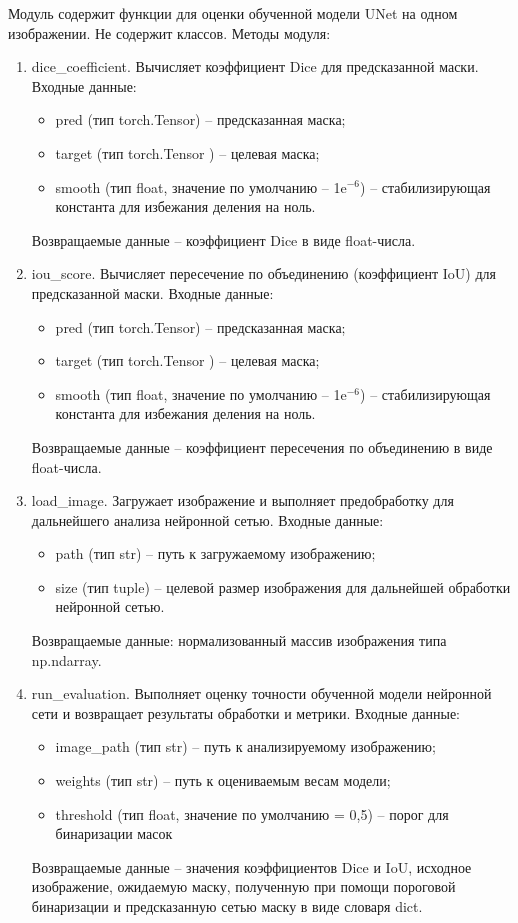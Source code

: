 Модуль содержит функции для оценки обученной модели UNet на одном изображении.  Не содержит классов. Методы модуля:
\begin{enumerate}
	\item dice\_coefficient. Вычисляет коэффициент Dice для предсказанной маски. Входные данные:
	\begin{itemize}
		\item pred (тип torch.Tensor) -- предсказанная маска;
		\item target (тип torch.Tensor ) -- целевая маска;
		\item smooth (тип float,  значение по умолчанию -- 1e$^{-6} $) -- стабилизирующая константа для избежания деления на ноль.
	\end{itemize}
	Возвращаемые данные -- коэффициент Dice в виде float-числа.
	\item iou\_score. Вычисляет пересечение по объединению (коэффициент IoU) для предсказанной маски. Входные данные:
	\begin{itemize}
		\item pred (тип torch.Tensor) -- предсказанная маска;
		\item target (тип torch.Tensor ) -- целевая маска;
		\item smooth (тип float,  значение по умолчанию -- 1e$^{-6} $) -- стабилизирующая константа для избежания деления на ноль.
	\end{itemize}
	Возвращаемые данные -- коэффициент пересечения по объединению в виде float-числа.
	\item load\_image. Загружает изображение и выполняет предобработку для дальнейшего анализа нейронной сетью. Входные данные:
	\begin{itemize}
		\item path (тип str) -- путь к загружаемому изображению;
		\item size (тип tuple) -- целевой размер изображения для дальнейшей обработки нейронной сетью.
	\end{itemize}
	Возвращаемые данные: нормализованный массив изображения типа np.ndarray.
	\item run\_evaluation. Выполняет оценку точности обученной модели нейронной сети и возвращает результаты обработки и метрики. Входные данные:
	\begin{itemize}
		\item image\_path (тип str) -- путь к анализируемому изображению;
		\item weights (тип str) -- путь к оцениваемым весам модели;
		\item threshold (тип float, значение по умолчанию = 0,5) -- порог для бинаризации масок
	\end{itemize}
	Возвращаемые данные -- значения коэффициентов Dice и IoU, исходное изображение, ожидаемую маску, полученную при помощи пороговой бинаризации и предсказанную сетью маску в виде словаря dict.
\end{enumerate}

